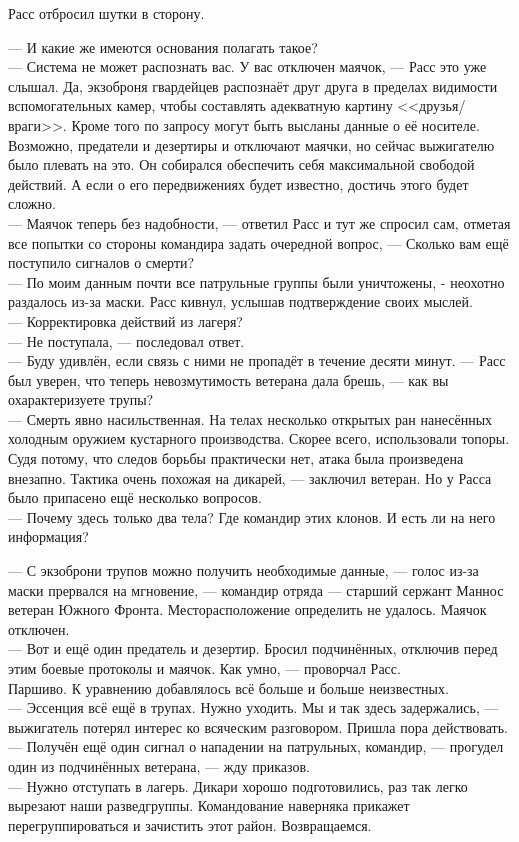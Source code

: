 Расс отбросил шутки в сторону.

\noindent --- И какие же имеются основания полагать такое?\\
--- Система не может распознать вас. У вас отключен маячок, --- Расс это уже 
слышал. Да, экзоброня гвардейцев распознаёт друг друга в пределах видимости 
вспомогательных камер, чтобы составлять адекватную картину <<друзья/враги>>. 
Кроме того по запросу могут быть высланы данные о её носителе. Возможно, 
предатели и дезертиры и отключают маячки, но сейчас выжигателю было плевать на 
это. Он собирался обеспечить себя максимальной свободой действий. А если о его 
передвижениях будет известно, достичь этого будет сложно.\\
--- Маячок теперь без надобности, --- ответил Расс и тут же спросил сам, 
отметая все попытки со стороны командира задать очередной вопрос, --- Сколько 
вам ещё поступило сигналов о смерти?\\
--- По моим данным почти все патрульные группы были уничтожены, - неохотно 
раздалось из-за маски. Расс кивнул, услышав подтверждение своих мыслей.\\
--- Корректировка действий из лагеря?\\
--- Не поступала, --- последовал ответ.\\
--- Буду удивлён, если связь с ними не пропадёт в течение десяти минут. --- 
Расс был уверен, что теперь невозмутимость ветерана дала брешь, --- как вы 
охарактеризуете трупы?\\
--- Смерть явно насильственная. На телах несколько открытых ран нанесённых 
холодным оружием кустарного производства. Скорее всего, использовали топоры. 
Судя потому, что следов борьбы практически нет, атака была произведена внезапно. 
Тактика очень похожая на дикарей, --- заключил ветеран. Но у Расса было 
припасено ещё несколько вопросов.\\
--- Почему здесь только два тела? Где командир этих клонов. И есть ли на него 
информация?

\noindent --- С экзоброни трупов можно получить необходимые данные, --- голос 
из-за маски прервался на мгновение, --- командир отряда --- старший сержант 
Маннос ветеран Южного Фронта. Месторасположение определить не удалось. Маячок 
отключен.\\
--- Вот и ещё один предатель и дезертир. Бросил подчинённых, отключив перед 
этим боевые протоколы и маячок. Как умно, --- проворчал Расс.\\ 
Паршиво. К уравнению добавлялось всё больше и больше неизвестных.\\
--- Эссенция всё ещё в трупах. Нужно уходить. Мы и так здесь задержались, --- 
выжигатель потерял интерес ко всяческим разговором. Пришла пора действовать.\\
--- Получён ещё один сигнал о нападении на патрульных, командир, --- прогудел 
один из подчинённых ветерана, --- жду приказов.\\
--- Нужно отступать в лагерь. Дикари хорошо подготовились, раз так легко 
вырезают наши разведгруппы. Командование наверняка прикажет перегруппироваться 
и зачистить этот район. Возвращаемся.

